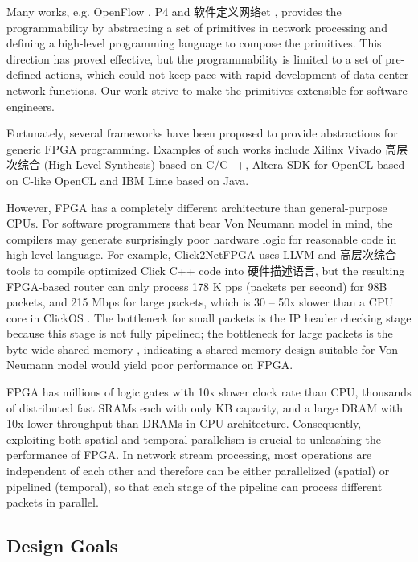 {Many works, e.g. OpenFlow \cite{mckeown2008openflow}, P4 \cite{bosshart2014p4} and 软件定义网络et \cite{xilinxsdnet}, provides the programmability by abstracting a set of primitives in network processing and defining a high-level programming language to compose the primitives. This direction has proved effective, but the programmability is limited to a set of pre-defined actions, which could not keep pace with rapid development of data center network functions. Our work strive to make the primitives extensible for software engineers.

Fortunately, several frameworks have been proposed to provide abstractions for generic FPGA programming. Examples of such works include Xilinx Vivado 高层次综合 (High Level Synthesis) \cite{feist2012vivado} based on C/C++, Altera SDK for OpenCL \cite{czajkowski2012opencl} based on C-like OpenCL and IBM Lime \cite{auerbach2010lime} based on Java.

However, FPGA has a completely different architecture than general-purpose CPUs. For software programmers that bear Von Neumann model in mind, the compilers may generate surprisingly poor hardware logic for reasonable code in high-level language. For example, Click2NetFPGA \cite{Click2NetFPGA} uses LLVM and 高层次综合 tools to compile optimized Click C++ code into 硬件描述语言, but the resulting FPGA-based router can only process 178 K pps (packets per second) for 98B packets, and 215 Mbps for large packets, which is 30 -- 50x slower than a CPU core in ClickOS \cite{martins2014clickos}. The bottleneck for small packets is the IP header checking stage \cite{Click2NetFPGA} because this stage is not fully pipelined; the bottleneck for large packets is the byte-wide shared memory \cite{Click2NetFPGA}, indicating a shared-memory design suitable for Von Neumann model would yield poor performance on FPGA.

FPGA has millions of logic gates with 10x slower clock rate than CPU, thousands of distributed fast SRAMs each with only KB capacity, and a large DRAM with 10x lower throughput than DRAMs in CPU architecture. Consequently, exploiting both spatial and temporal parallelism is crucial to unleashing the performance of FPGA. In network stream processing, most operations are independent of each other and therefore can be either parallelized (spatial) or pipelined (temporal), so that each stage of the pipeline can process different packets in parallel.

\subsection{Design Goals}
\label{clicknp:subsec:designgoals}

}
